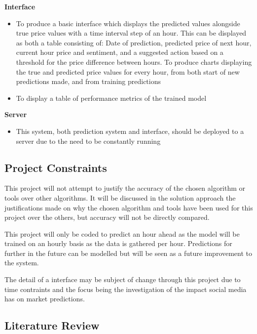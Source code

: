 \documentclass[oneside, 10pt]{article}
\begin{document}
		\textbf{Interface}
		\begin{itemize}
			\item To produce a basic interface which displays the predicted values alongside true price values with a time interval step of an hour. This can be displayed as both a table consisting of: 
			\subitem Date of prediction, predicted price of next hour, current hour price and sentiment, and a suggested action based on a threshold for the price difference between hours.
			\subitem To produce charts displaying the true and predicted price values for every hour, from both start of new predictions made, and from training predictions
			\item To display a table of performance metrics of the trained model
			\newline
		\end{itemize}
	
		\textbf{Server}
		\begin{itemize}
			\item This system, both prediction system and interface, should be deployed to a server due to the need to be constantly running
		\end{itemize}
		
		\subsection{Project Constraints}\label{constraints}
		
		This project will not attempt to justify the accuracy of the chosen algorithm or tools over other algorithms. It will be discussed in the solution approach the justifications made on why the chosen algorithm and tools have been used for this project over the others, but accuracy will not be directly compared.
		
		This project will only be coded to predict an hour ahead as the model will be trained on an hourly basis as the data is gathered per hour. Predictions for further in the future can be modelled but will be seen as a future improvement to the system.
		
		The detail of a interface may be subject of change through this project due to time contraints and the focus being the investigation of the impact social media has on market predictions.
		
	
	\newpage
	
	\begin{center}
		\section{Literature Review}\label{literature}
	\end{center}
\end{document}
